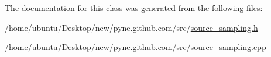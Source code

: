 The documentation for this class was generated from the following files\+:\begin{DoxyCompactItemize}
\item 
/home/ubuntu/\+Desktop/new/pyne.\+github.\+com/src/\hyperlink{source__sampling_8h}{source\+\_\+sampling.\+h}\item 
/home/ubuntu/\+Desktop/new/pyne.\+github.\+com/src/source\+\_\+sampling.\+cpp\end{DoxyCompactItemize}
